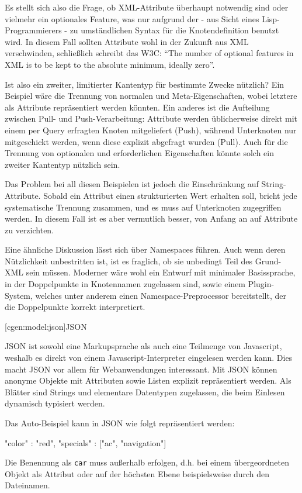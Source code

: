 \documentclass[a4paper, bibgerm]{book}
\newcommand\icode[1]{\lstinline?#1?}
\newcommand\lsubsection{}
\begin{document}
Es stellt sich also die Frage, ob XML-Attribute überhaupt notwendig sind
oder vielmehr ein optionales Feature, was nur aufgrund der - aus Sicht
eines Lisp-Programmierers - zu umständlichen Syntax für die
Knotendefinition benutzt wird. In diesem Fall sollten Attribute wohl in
der Zukunft aus XML verschwinden, schließlich schreibt das
W3C\cite{rec_xml}: "`The number of optional features in XML is to be
kept to the absolute minimum, ideally zero"'.

Ist also ein zweiter, limitierter Kantentyp für bestimmte Zwecke
nützlich? Ein Beispiel wäre die Trennung von normalen und
Meta-Eigenschaften, wobei letztere als Attribute repräsentiert werden
könnten. Ein anderes ist die Aufteilung zwischen Pull- und
Push-Verarbeitung: Attribute werden üblicherweise direkt mit einem per
Query erfragten Knoten mitgeliefert (Push), während Unterknoten nur
mitgeschickt werden, wenn diese explizit abgefragt wurden (Pull). Auch
für die Trennung von optionalen und erforderlichen Eigenschaften könnte
solch ein zweiter Kantentyp nützlich sein.

Das Problem bei all diesen Beispielen ist jedoch die Einschränkung auf
String-Attribute. Sobald ein Attribut einen strukturierten Wert erhalten
soll, bricht jede systematische Trennung zusammen, und es muss auf
Unterknoten zugegriffen werden. In diesem Fall ist es aber vermutlich
besser, von Anfang an auf Attribute zu verzichten.

Eine ähnliche Diskussion lässt sich über Namespaces führen. Auch wenn
deren Nützlichkeit unbestritten ist, ist es fraglich, ob sie unbedingt
Teil des Grund-XML sein müssen. Moderner wäre wohl ein Entwurf mit
minimaler Basissprache, in der Doppelpunkte in Knotennamen zugelassen
sind, sowie einem Plugin-System, welches unter anderem einen
Namespace-Preprocessor bereitstellt, der die Doppelpunkte korrekt
interpretiert.

\lsubsection[cgen:model:json]{JSON}

JSON ist sowohl eine Markupsprache als auch eine Teilmenge von
Javascript, weshalb es direkt von einem Javascript-Interpreter
eingelesen werden kann. Dies macht JSON vor allem für Webanwendungen
interessant. Mit JSON können anonyme Objekte mit Attributen sowie Listen
explizit repräsentiert werden. Als Blätter sind Strings und elementare
Datentypen zugelassen, die beim Einlesen dynamisch typisiert werden.

Das Auto-Beispiel kann in JSON wie folgt repräsentiert werden:
\begin{code}
{
  "color"    : "red",
  "specials" : ["ac", "navigation"]
}
\end{code}
Die Benennung als \icode{car} muss außerhalb erfolgen, d.h. bei einem
übergeordneten Objekt als Attribut oder auf der höchsten Ebene
beispielsweise durch den Dateinamen.
\end{document}
